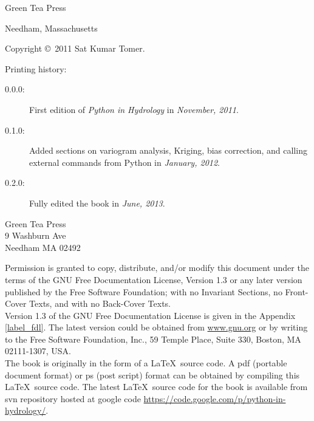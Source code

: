 \documentclass[10pt]{book}
\begin{document}
\begin{latexonly}
\begin{flushright}
\vspace{0.5in}

\vfill
{\Large Green Tea Press}

{\small Needham, Massachusetts}



\end{flushright}


\pagebreak
\thispagestyle{empty}

{\small
Copyright \copyright ~2011 Sat Kumar Tomer.


Printing history:

\begin{description}

\item[0.0.0:] First edition of {\em Python in Hydrology} in \emph{November, 2011}.
\item[0.1.0:] Added sections on variogram analysis, Kriging, bias correction, and calling external commands from Python in \emph{January, 2012}. 
\item[0.2.0:] Fully edited the book in \emph{June, 2013}.
\end{description}

\vspace{0.2in}

\begin{flushleft}
Green Tea Press       \\
9 Washburn Ave \\
Needham MA 02492
\end{flushleft}

Permission is granted to copy, distribute, and/or modify this document under the terms of the GNU Free Documentation License, Version 1.3 or
any later version published by the Free Software Foundation; with no
Invariant Sections, no Front-Cover Texts, and with no Back-Cover Texts. \\

Version 1.3 of the GNU Free Documentation License is given in the Appendix \ref{label_fdl}. The latest version could be obtained from  \url{www.gnu.org} or by writing to the Free Software Foundation, Inc., 59 Temple Place,
Suite 330, Boston, MA 02111-1307, USA. \\ 

The book is originally in the form of a \LaTeX\ source code. 
A pdf (portable document format) or ps (post script) format can be obtained 
by compiling this \LaTeX\ source code. The latest \LaTeX\ source code for the 
book is available from svn repository hosted at google code 
\url{https://code.google.com/p/python-in-hydrology/}. 

\vspace{0.2in}

} %

\end{latexonly}
\end{document}
